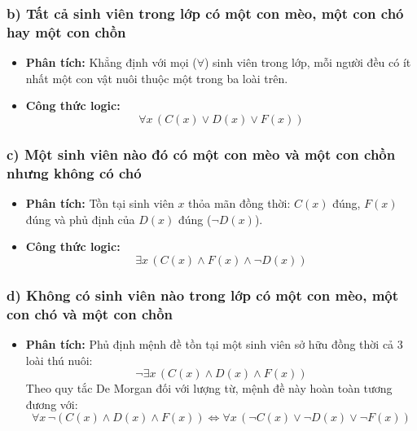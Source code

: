 \documentclass[12pt,a4paper]{article}
\begin{document}
\subsubsection{b) Tất cả sinh viên trong lớp có một con mèo, một con chó hay một con chồn}
\begin{itemize}
    \item \textbf{Phân tích:} Khẳng định với mọi ($\forall$) sinh viên trong lớp, mỗi người đều có ít nhất một con vật nuôi thuộc một trong ba loài trên.
    \item \textbf{Công thức logic:}
    \begin{equation}
        \forall x \, (C(x) \lor D(x) \lor F(x))
    \end{equation}
\end{itemize}

\subsubsection{c) Một sinh viên nào đó có một con mèo và một con chồn nhưng không có chó}
\begin{itemize}
    \item \textbf{Phân tích:} Tồn tại sinh viên $x$ thỏa mãn đồng thời: $C(x)$ đúng, $F(x)$ đúng và phủ định của $D(x)$ đúng ($\neg D(x)$).
    \item \textbf{Công thức logic:}
    \begin{equation}
        \exists x \, (C(x) \land F(x) \land \neg D(x))
    \end{equation}
\end{itemize}

\subsubsection{d) Không có sinh viên nào trong lớp có một con mèo, một con chó và một con chồn}
\begin{itemize}
    \item \textbf{Phân tích:} Phủ định mệnh đề tồn tại một sinh viên sở hữu đồng thời cả 3 loài thú nuôi:
    \begin{equation}
        \neg \exists x \, (C(x) \land D(x) \land F(x))
    \end{equation}
    Theo quy tắc De Morgan đối với lượng từ, mệnh đề này hoàn toàn tương đương với:
    \begin{equation}
        \forall x \, \neg (C(x) \land D(x) \land F(x)) \iff \forall x \, (\neg C(x) \lor \neg D(x) \lor \neg F(x))
    \end{equation}
\end{itemize}
\end{document}
